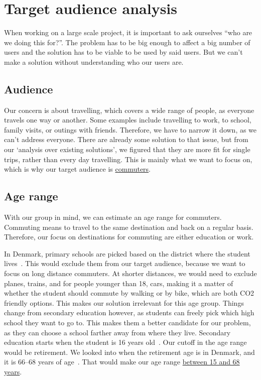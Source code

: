 \section{Target audience analysis}\label{sec:target-audience-analysis}

When working on a large scale project, it is important to ask ourselves ``who are we doing this for?''.
The problem has to be big enough to affect a big number of users and the solution has to be viable to be used by said
users.
But we can't make a solution without understanding who our users are.

\subsection{Audience}\label{subsec:audience}

Our concern is about travelling, which covers a wide range of people, as everyone travels one way or another.
Some examples include travelling to work, to school, family visits, or outings with friends.
Therefore, we have to narrow it down, as we can't address everyone.
There are already some solution to that issue, but from our `analysis over existing solutions', we figured that they are
more fit for single trips, rather than every day travelling.
This is mainly what we want to focus on, which is why our target audience is \underline{commuters}.

\subsection{Age range}\label{subsec:age-range}

With our group in mind, we can estimate an age range for commuters.
Commuting means to travel to the same destination and back on a regular basis.
Therefore, our focus on destinations for commuting are either education or work.

In Denmark, primary schools are picked based on the district where the student lives~\cite{primary_school}.
This would exclude them from our target audience, because we want to focus on long distance commuters.
At shorter distances, we would need to exclude planes, trains, and for people younger than 18, cars, making it a matter
of whether the student should commute by walking or by bike, which are both CO2 friendly options.
This makes our solution irrelevant for this age group.
Things change from secondary education however, as students can freely pick which high school they want to go to.
This makes them a better candidate for our problem, as they can choose a school farther away from where they live.
Secondary education starts when the student is 16 years old~\cite{secondary_school}.
Our cutoff in the age range would be retirement.
We looked into when the retirement age is in Denmark, and it is 66--68 years of age~\cite{retirement}.
That would make our age range \underline{between 15 and 68 years}.

